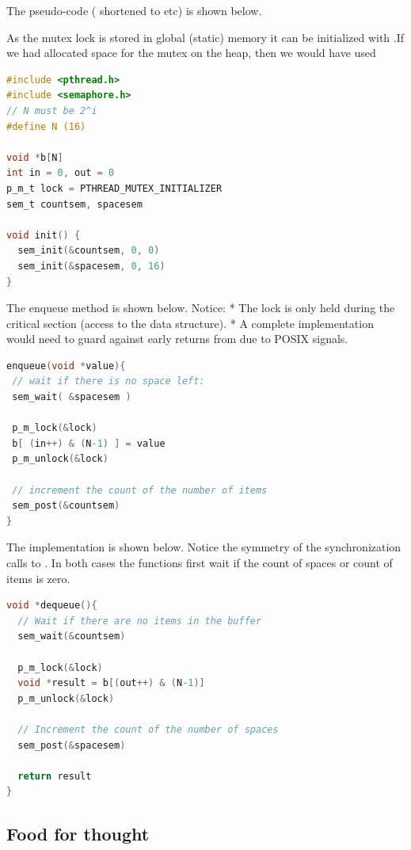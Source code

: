The pseudo-code ( shortened to  etc) is shown below.

As the mutex lock is stored in global (static) memory it can be initialized with .If we had allocated space for the mutex on the heap, then we would have used 

\begin{lstlisting}[language=C]
#include <pthread.h>
#include <semaphore.h>
// N must be 2^i
#define N (16)

void *b[N]
int in = 0, out = 0
p_m_t lock = PTHREAD_MUTEX_INITIALIZER
sem_t countsem, spacesem

void init() {
  sem_init(&countsem, 0, 0)
  sem_init(&spacesem, 0, 16)
}
\end{lstlisting}

The enqueue method is shown below. Notice: * The lock is only held during the critical section (access to the data structure). * A complete implementation would need to guard against early returns from  due to POSIX signals.

\begin{lstlisting}[language=C]
enqueue(void *value){
 // wait if there is no space left:
 sem_wait( &spacesem )

 p_m_lock(&lock)
 b[ (in++) & (N-1) ] = value
 p_m_unlock(&lock)

 // increment the count of the number of items
 sem_post(&countsem)
}
\end{lstlisting}

The  implementation is shown below. Notice the symmetry of the synchronization calls to . In both cases the functions first wait if the count of spaces or count of items is zero.

\begin{lstlisting}[language=C]
void *dequeue(){
  // Wait if there are no items in the buffer
  sem_wait(&countsem)

  p_m_lock(&lock)
  void *result = b[(out++) & (N-1)]
  p_m_unlock(&lock)

  // Increment the count of the number of spaces
  sem_post(&spacesem)

  return result
}
\end{lstlisting}

\subsection{Food for thought}\label{food-for-thought}

